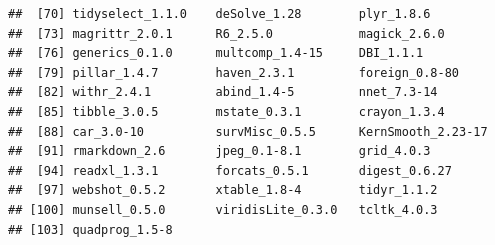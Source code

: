 \documentclass[
]{article}
\begin{document}
\begin{verbatim}
##  [70] tidyselect_1.1.0    deSolve_1.28        plyr_1.8.6         
##  [73] magrittr_2.0.1      R6_2.5.0            magick_2.6.0       
##  [76] generics_0.1.0      multcomp_1.4-15     DBI_1.1.1          
##  [79] pillar_1.4.7        haven_2.3.1         foreign_0.8-80     
##  [82] withr_2.4.1         abind_1.4-5         nnet_7.3-14        
##  [85] tibble_3.0.5        mstate_0.3.1        crayon_1.3.4       
##  [88] car_3.0-10          survMisc_0.5.5      KernSmooth_2.23-17 
##  [91] rmarkdown_2.6       jpeg_0.1-8.1        grid_4.0.3         
##  [94] readxl_1.3.1        forcats_0.5.1       digest_0.6.27      
##  [97] webshot_0.5.2       xtable_1.8-4        tidyr_1.1.2        
## [100] munsell_0.5.0       viridisLite_0.3.0   tcltk_4.0.3        
## [103] quadprog_1.5-8
\end{verbatim}
\end{document}

